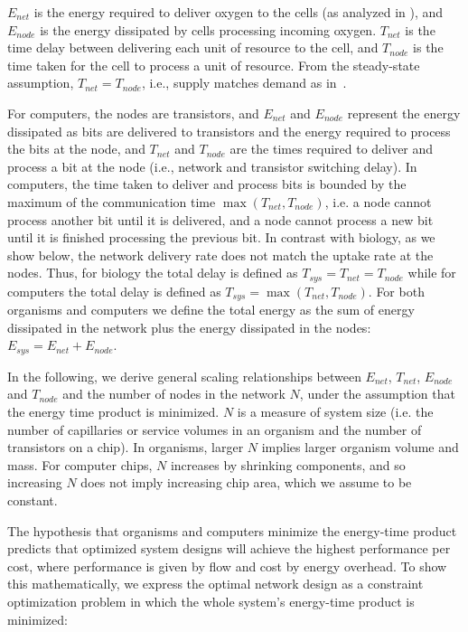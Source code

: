 \documentclass[12pt]{article}
\begin{document}
$E_{net}$ is the energy required to deliver oxygen to the cells (as analyzed in
\cite{west97}), and $E_{node}$ is the energy dissipated by cells processing
incoming oxygen. $T_{net}$ is the time delay between delivering
each unit of resource to the cell, and $T_{node}$ is the time taken
for the cell to process a unit of resource. From the steady-state assumption, $T_{net} = T_{node}$,
i.e., supply matches demand as in~\cite{banavar10}.

For computers, the nodes are transistors, and 
$E_{net}$ and $E_{node}$ represent the energy dissipated as bits are delivered
to transistors and the energy required to process the bits at the node, and
$T_{net}$ and $T_{node}$ are the times required to deliver and process a bit at
the node (i.e., network and transistor switching delay).  In computers, the time
taken to deliver and process bits is bounded by the maximum of the
communication time $\max(T_{net},T_{node})$, i.e. a node cannot process another
bit until it is delivered, and a node cannot process a new bit until it is finished
processing the previous bit. 
In contrast with biology, as we show below, the
network delivery rate does not match the uptake rate at the nodes.  Thus,  for
biology the total delay is defined as $T_{sys}=T_{net} = T_{node}$ while for
computers the total delay is defined as $T_{sys}=\max(T_{net},T_{node})$. For
both organisms and computers we define the total energy as the sum of energy
dissipated in the network plus the energy dissipated in the nodes: $E_{sys} =
E_{net} + E_{node}$.

In the following, we derive general scaling relationships between $E_{net}$,
$T_{net}$, $E_{node}$ and $T_{node}$ and the number of nodes in the network
$N$, under the assumption that the energy time product is minimized.  $N$ is a
measure of system size (i.e. the number of capillaries or service volumes in
an organism and the number of transistors on a chip). In organisms, larger $N$
implies larger organism volume and mass. For computer chips, $N$ increases by
shrinking components, and so increasing $N$ does not imply increasing chip
area, which we assume to be constant.

The hypothesis that organisms and computers minimize the energy-time product
predicts that optimized system designs will achieve
the highest performance per cost, where performance is given by flow and cost
by energy overhead.  To show this mathematically, 
we express the optimal network design as a constraint optimization problem in
which the whole system's energy-time product is minimized:
\end{document}
